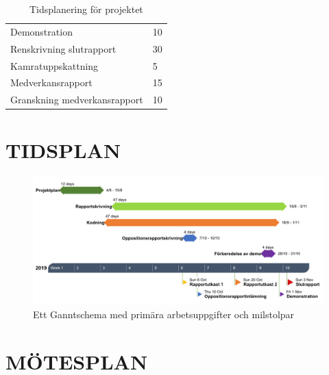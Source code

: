 \documentclass[a4paper]{article}
\begin{document}
\begin{table}[b]
\begin{tabular}{|l|l|}
Demonstration                                             & 10               \\
Renskrivning slutrapport                                  & 30               \\
Kamratuppskattning                                        & 5                \\
Medverkansrapport                                         & 15               \\
Granskning medverkansrapport                              & 10               \\ \hline
\end{tabular}
\caption{Tidsplanering för projektet}
\label{tab:aktiviteter}
\end{table}

\section{TIDSPLAN}
\label{sec:tidsplan}

\begin{figure}[h]
	\includegraphics[width=1\textwidth]{figurer/Gantt.png}
	\caption{Ett Ganntschema med primära arbetsuppgifter och milstolpar}
	\label{fig:Gantt}
\end{figure}

\section{MÖTESPLAN}
\label{sec:mötesplan}
\end{document}
